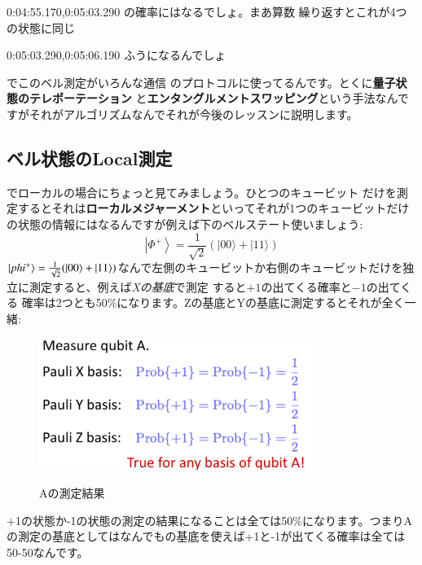 0:04:55.170,0:05:03.290
の確率にはなるでしょ。まあ算数
繰り返すとこれが4つの状態に同じ

0:05:03.290,0:05:06.190
ふうになるんでしょ
\fi

でこのベル測定がいろんな通信
のプロトコルに使ってるんです。とくに\textbf{量子状態のテレポーテーション}
と\textbf{エンタングルメントスワッピング}という手法なんですがそれがアルゴリズムなんでそれが今後のレッスンに説明します。
\subsection{ベル状態のLocal測定 }
でローカルの場合にちょっと見てみましょう。ひとつのキュービット
だけを測定するとそれは\textbf{ローカルメジャーメント}といってそれが1つのキュービットだけの状態の情報にはなるんですが例えば下のベルステート使いましょう:
\begin{equation}
\left|\Phi^{+}\right\rangle=\frac{1}{\sqrt{2}}(|00\rangle+|11\rangle)
\end{equation}
$\ket{phi^{+}}= \frac{1}{\sqrt{2}}(\ket{00}+\ket{11})$なんで左側のキュービットか右側のキュービットだけを独立に測定すると、例えば\textit{Xの基底}で測定
すると$+1$の出てくる確率と$-1$の出てくる
確率は2つとも50\%になります。Zの基底とYの基底に測定するとそれが全く一緒:
\begin{figure}[H]
    \centering
    \includegraphics[width=0.8\textwidth]{lesson4/Qubit_A.pdf}
    \label{fig: 1}
    \begin{center}
        \caption{Aの測定結果}
    \end{center}
\end{figure}

+1の状態か-1の状態の測定の結果になることは全ては50\%になります。つまりAの測定の基底としてはなんでもの基底を使えば+1と-1が出てくる確率は全ては50-50なんです。

